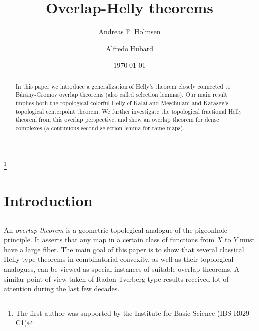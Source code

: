 \documentclass[12pt,a4paper,oneside]{amsart}\sloppy
\theoremstyle{definition}
\begin{document}
 

\title{Overlap-Helly theorems}  


\author{Andreas F. Holmsen}
\author{Alfredo Hubard}

\thanks{The first author was supported by the Institute for Basic Science (IBS-R029-C1)}

\date{\today}

 \address{Andreas F. Holmsen, 
 \hfill \hfill \linebreak 
 Department of Mathematical Sciences,  \hfill \hfill \linebreak
KAIST, 
 Daejeon, South Korea,  \hfill \hfill \linebreak and \hfill \hfill \linebreak
 Discrete Mathematics Group, \hfill\hfill\linebreak
 Institute for Basic Science, \hfill\hfill\linebreak
  Daejeon, South Korea. }

  \address{Alfredo Hubard, 
 \hfill \hfill \linebreak 
 LIGM,  \hfill \hfill \linebreak
Universite Gustave Eiffel, 
 Champs-sur-Marne, France.  \hfill \hfill }


\begin{abstract} 
In this paper we introduce a generalization of Helly's theorem closely connected to B\'ar\'any-Gromov overlap theorems (also called selection lemmas). Our main result implies both the topological colorful Helly of Kalai and Meschulam and Karasev's topological centerpoint theorem. We further investigate the topological fractional Helly theorem from this overlap perspective, and show an overlap theorem for dense complexes (a continuous second selection lemma for tame maps).
\end{abstract}

\maketitle 

\section{Introduction}

\subsection{} An \emph{overlap theorem} is a geometric-topological analogue of the pigeonhole principle. It asserts that any map in a certain class of functions from $X$ to $Y$ must have a large fiber.
The main goal of this paper is to show that several classical Helly-type theorems in combinatorial convexity, as well as their topological analogues, can be viewed as special instances of suitable overlap theorems. A similar point of view taken of Radon-Tverberg type results received lot of attention during the last few decades.
\end{document}
